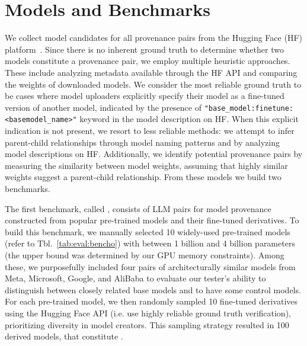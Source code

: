 \section{Models and Benchmarks}
\label{sec:appendix:benchmarks}

We collect model candidates for all provenance pairs from the Hugging Face (HF) platform~\cite{huggingface}.
Since there is no inherent ground truth to determine whether two models constitute a provenance pair, we employ multiple heuristic approaches. These include analyzing metadata available through the HF API and comparing the weights of downloaded models.
We consider the most reliable ground truth to be cases where model uploaders explicitly specify their model as a fine-tuned version of another model, indicated by the presence of \texttt{"base\_model:finetune:<basemodel\_name>"} keyword in the model description on HF. 
When this explicit indication is not present, we resort to less reliable methods: we attempt to infer parent-child relationships through model naming patterns and by analyzing model descriptions on HF. Additionally, we identify potential provenance pairs by measuring the similarity between model weights, assuming that highly similar weights suggest a parent-child relationship. 
From these models we build two benchmarks.


The first benchmark, called \bencho, consists of LLM pairs for model provenance constructed from popular pre-trained models and their fine-tuned derivatives. To build this benchmark, we manually selected 10 widely-used pre-trained models (refer to Tbl.~\ref{tab:eval:bencho}) with between 1 billion and 4 billion parameters (the upper bound was determined by our GPU memory constraints). Among these, we purposefully included four pairs of architecturally similar models from Meta, Microsoft, Google, and AliBaba to evaluate our tester's ability to distinguish between closely related base models and to have some control models. For each pre-trained model, we then randomly sampled 10 fine-tuned derivatives using the Hugging Face API (i.e. use highly reliable ground truth verification), prioritizing diversity in model creators. 
This sampling strategy resulted in 100 derived models, that constitute \bencho. 

